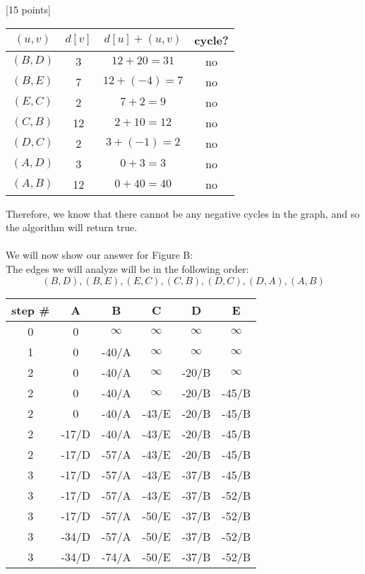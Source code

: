 \documentclass[12pt]{article}
\newcounter{ques}
\newenvironment{question}{\stepcounter{ques}{\noindent\bf Question \arabic{ques}:}}{\vspace{5mm}}
\begin{document}
\begin{question}[15 points]
\begin{center}
  \begin{tabular}{||c|c|c|c||}
   \hline
    $(u,v)$ & $d[v]$ & $d[u] + (u,v)$ & cycle?\\ [0.5ex]
   \hline\hline
   $(B,D)$ & 3 & $12+20=31$ & no\\
   \hline
   $(B,E)$ & 7 & $12+(-4)=7$ & no\\
   \hline
   $(E,C)$ & 2 & $7+2=9$ & no\\
   \hline
   $(C,B)$ & 12 & $2+10=12$ & no\\
   \hline
   $(D,C)$ & 2 & $3+(-1)=2$ & no\\
   \hline
   $(A,D)$ & 3 & $0+3=3$ & no\\
   \hline
   $(A,B)$ & 12 & $0+40=40$ & no\\
   \hline
  \end{tabular}
\end{center}
Therefore, we know that there cannot be any negative cycles in the graph, and so the algorithm will return true.\\\\
We will now show our answer for Figure B:\\
The edges we will analyze will be in the following order:
$$(B, D), (B, E), (E, C), (C, B), (D, C), (D, A), (A, B)$$
\begin{center}
  \begin{tabular}{||c | c c c c c||}
   \hline
    step \# & A & B & C & D & E \\ [0.5ex]
   \hline\hline
   0 & 0 & $\infty$ & $\infty$ & $\infty$ & $\infty$\\
   \hline
   1 & 0 & -40/A & $\infty$ & $\infty$ & $\infty$\\
   \hline
   2 & 0 & -40/A & $\infty$ & -20/B & $\infty$\\
   2 & 0 & -40/A & $\infty$ & -20/B & -45/B\\
   2 & 0 & -40/A & -43/E & -20/B & -45/B\\
   2 & -17/D & -40/A & -43/E & -20/B & -45/B\\
   2 & -17/D & -57/A & -43/E & -20/B & -45/B\\
   \hline
   3 & -17/D & -57/A & -43/E & -37/B & -45/B\\
   3 & -17/D & -57/A & -43/E & -37/B & -52/B\\
   3 & -17/D & -57/A & -50/E & -37/B & -52/B\\
   3 & -34/D & -57/A & -50/E & -37/B & -52/B\\
   3 & -34/D & -74/A & -50/E & -37/B & -52/B\\

\end{tabular}
\end{center}
\end{question}
\end{document}
